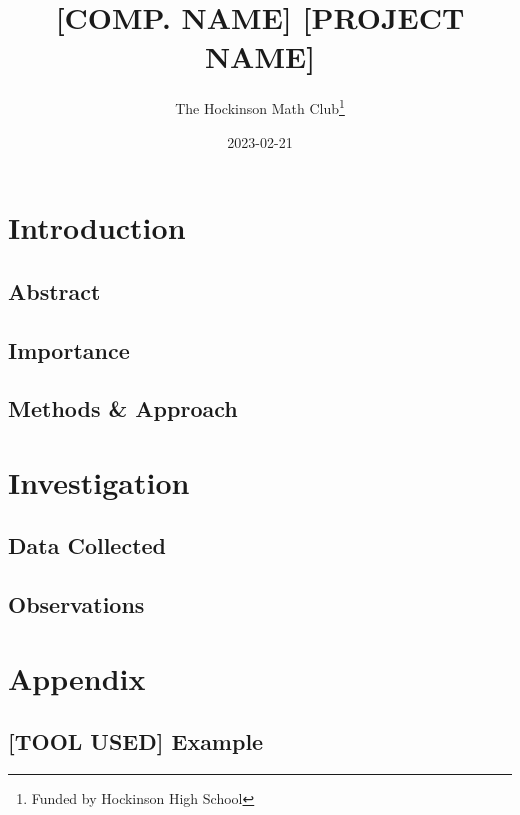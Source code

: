 \documentclass[12pt, letterpaper]{article}
\title{[COMP. NAME] [PROJECT NAME]}
\author{The Hockinson Math Club\thanks{Funded by Hockinson High School}}
\date{2023-02-21}
\begin{document}
\maketitle              %
\tableofcontents        %

\section{Introduction}

\subsection{Abstract}
\blindtext

\subsection{Importance}
\blindtext
\blindtext

\subsection{Methods \& Approach}
\blindtext

\section{Investigation}

\subsection{Data Collected}
\blindtext
\blindtext
\blindtext
\blindtext

\subsection{Observations}
\blindtext
\blindtext

\section{Appendix}

\subsection{[TOOL USED] Example}
\blindtext
\blindtext
\blindtext
\end{document}
